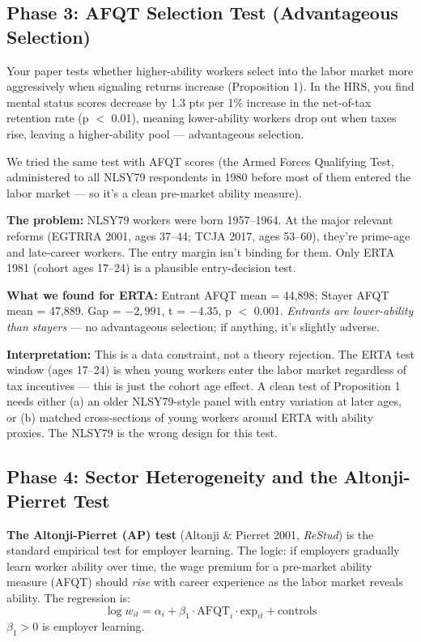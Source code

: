 \documentclass[11pt, letterpaper]{article}
\begin{document}
\subsection{Phase 3: AFQT Selection Test (Advantageous Selection)}

Your paper tests whether higher-ability workers select into the labor market more aggressively when signaling returns increase (Proposition 1). In the HRS, you find mental status scores decrease by 1.3 pts per 1\% increase in the net-of-tax retention rate (p $<$ 0.01), meaning lower-ability workers drop out when taxes rise, leaving a higher-ability pool --- advantageous selection.

We tried the same test with AFQT scores (the Armed Forces Qualifying Test, administered to all NLSY79 respondents in 1980 before most of them entered the labor market --- so it's a clean pre-market ability measure).

\textbf{The problem:} NLSY79 workers were born 1957--1964. At the major relevant reforms (EGTRRA 2001, ages 37--44; TCJA 2017, ages 53--60), they're prime-age and late-career workers. The entry margin isn't binding for them. Only ERTA 1981 (cohort ages 17--24) is a plausible entry-decision test.

\textbf{What we found for ERTA:} Entrant AFQT mean = 44,898; Stayer AFQT mean = 47,889. Gap = $-2{,}991$, t = $-4.35$, p $<$ 0.001. \textit{Entrants are lower-ability than stayers} --- no advantageous selection; if anything, it's slightly adverse.

\textbf{Interpretation:} This is a data constraint, not a theory rejection. The ERTA test window (ages 17--24) is when young workers enter the labor market regardless of tax incentives --- this is just the cohort age effect. A clean test of Proposition 1 needs either (a) an older NLSY79-style panel with entry variation at later ages, or (b) matched cross-sections of young workers around ERTA with ability proxies. The NLSY79 is the wrong design for this test.

\subsection{Phase 4: Sector Heterogeneity and the Altonji-Pierret Test}

\textbf{The Altonji-Pierret (AP) test} (Altonji \& Pierret 2001, \textit{ReStud}) is the standard empirical test for employer learning. The logic: if employers gradually learn worker ability over time, the wage premium for a pre-market ability measure (AFQT) should \textit{rise} with career experience as the labor market reveals ability. The regression is:
$$\log w_{it} = \alpha_i + \beta_1 \cdot \text{AFQT}_i \cdot \text{exp}_{it} + \text{controls}$$
$\beta_1 > 0$ is employer learning.
\end{document}
